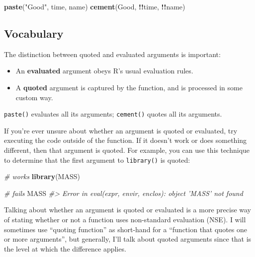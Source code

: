 \documentclass[]{book}
\newenvironment{Shaded}{\begin{snugshade}}{\end{snugshade}}
\newcommand{\CommentTok}[1]{\textcolor[rgb]{0.37,0.37,0.37}{\textit{#1}}}
\newcommand{\KeywordTok}[1]{\textcolor[rgb]{0.27,0.27,0.27}{\textbf{#1}}}
\newcommand{\NormalTok}[1]{#1}
\newcommand{\OperatorTok}[1]{\textcolor[rgb]{0.43,0.43,0.43}{\textbf{#1}}}
\newcommand{\StringTok}[1]{\textcolor[rgb]{0.5,0.5,0.5}{#1}}
\begin{document}
\begin{Shaded}
\begin{Highlighting}[]
\KeywordTok{paste}\NormalTok{(}\StringTok{"Good"}\NormalTok{, time, name)}
\KeywordTok{cement}\NormalTok{(Good, }\OperatorTok{!!}\NormalTok{time, }\OperatorTok{!!}\NormalTok{name)}
\end{Highlighting}
\end{Shaded}

\hypertarget{vocabulary}{%
\subsection{Vocabulary}\label{vocabulary}}


The distinction between quoted and evaluated arguments is important:

\begin{itemize}
\item
  An \textbf{evaluated} argument obeys R's usual evaluation rules.
\item
  A \textbf{quoted} argument is captured by the function, and is processed in
  some custom way.
\end{itemize}

\texttt{paste()} evaluates all its arguments; \texttt{cement()} quotes all its arguments.

If you're ever unsure about whether an argument is quoted or evaluated, try executing the code outside of the function. If it doesn't work or does something different, then that argument is quoted. For example, you can use this technique to determine that the first argument to \texttt{library()} is quoted:

\begin{Shaded}
\begin{Highlighting}[]
\CommentTok{# works}
\KeywordTok{library}\NormalTok{(MASS)}

\CommentTok{# fails}
\NormalTok{MASS}
\CommentTok{#> Error in eval(expr, envir, enclos): object 'MASS' not found}
\end{Highlighting}
\end{Shaded}

Talking about whether an argument is quoted or evaluated is a more precise way of stating whether or not a function uses non-standard evaluation (NSE). I will sometimes use ``quoting function'' as short-hand for a ``function that quotes one or more arguments'', but generally, I'll talk about quoted arguments since that is the level at which the difference applies.
\end{document}
